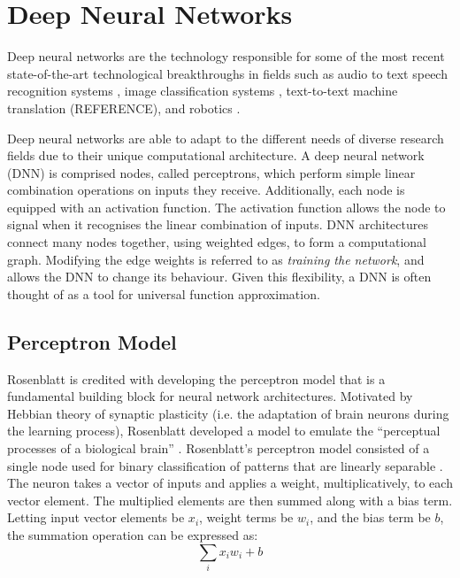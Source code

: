 \section{Deep Neural Networks}\label{dnn}
Deep neural networks are the technology responsible for some of the most recent state-of-the-art technological breakthroughs in fields such as audio to text speech recognition systems \cite{Hinton2012}, image classification systems \cite{Krizhevsky2012, Simonyan2014, Szegedy2015, He2016}, text-to-text machine translation (REFERENCE), and robotics \cite{Mnih2015, Lillicrap2015, Schulman2015, Schulman2015highdimensional}.

Deep neural networks are able to adapt to the different needs of diverse research fields due to their unique computational architecture. A deep neural network (DNN) is comprised nodes, called perceptrons, which perform simple linear combination operations on inputs they receive. Additionally, each node is equipped with an activation function. The activation function allows the node to signal when it recognises the linear combination of inputs. DNN architectures connect many nodes together, using weighted edges, to form a computational graph. Modifying the edge weights is referred to as \textit{training the network}, and allows the DNN to change its behaviour. Given this flexibility, a DNN is often thought of as a tool for universal function approximation.



\subsection{Perceptron Model}
Rosenblatt is credited with developing the perceptron model that is a fundamental building block for neural network architectures. Motivated by Hebbian theory of synaptic plasticity (i.e. the adaptation of brain neurons during the learning process), Rosenblatt developed a model to emulate the ``perceptual processes of a biological brain'' \cite{Rosenblatt1957}. Rosenblatt's perceptron model consisted of a single node used for binary classification of patterns that are linearly separable \cite{Rosenblatt1958}. The neuron takes a vector of inputs and applies a weight, multiplicatively, to each vector element. The multiplied elements are then summed along with a bias term. Letting input vector elements be $x_i$, weight terms be $w_i$, and the bias term be $b$, the summation operation can be expressed as:
\begin{equation}
	\sum_{i}x_i w_i + b \label{eq:2301}
\end{equation} 

